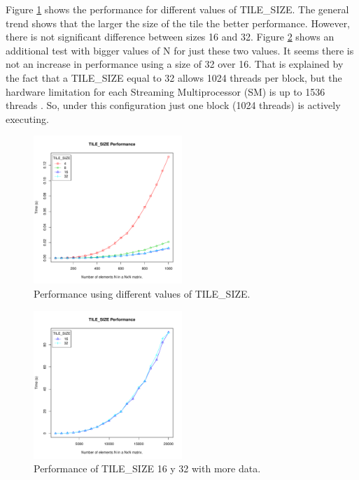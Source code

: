 \documentclass[a4paper,10pt]{scrartcl}
\begin{document}
\begin{enumerate}
Figure \ref{fig:TilesizePerformance_50-1K} shows the performance for different values of TILE\_SIZE.  The general trend shows that the larger the size of the tile the better performance.  However, there is not significant difference between sizes 16 and 32.  Figure \ref{fig:TilesizePerformance_1K-20K} shows an additional test with bigger values of N for just these two values.  It seems there is not an increase in performance using a size of 32 over 16.  That is explained by the fact that a TILE\_SIZE equal to 32 allows 1024 threads per block, but the hardware limitation for each Streaming Multiprocessor (SM) is up to 1536 threads \cite{kirk2012}. So, under this configuration just one block (1024 threads) is actively executing.
 
 \begin{figure}
 \centering
 \includegraphics[width=0.5\textwidth]{./TilesizePerformance_50-1K}
 \caption{Performance using different values of TILE\_SIZE.}\label{fig:TilesizePerformance_50-1K}
 \end{figure}

 \begin{figure}
 \centering
 \includegraphics[width=0.5\textwidth]{./TilesizePerformance_1K-20K}
 \caption{Performance of TILE\_SIZE 16 y 32 with more data.}\label{fig:TilesizePerformance_1K-20K}
 \end{figure}
 
\end{enumerate}
\end{document}

